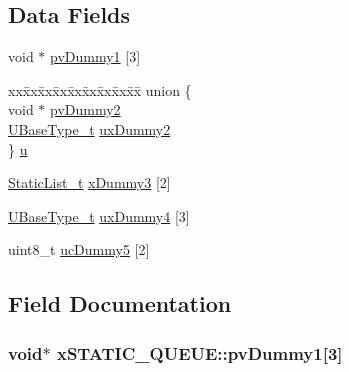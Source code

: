 \subsection*{Data Fields}
\begin{DoxyCompactItemize}
\item 
void $\ast$ \hyperlink{structxSTATIC__QUEUE_aacf22a66a8d723648995692ec77ee416}{pv\+Dummy1} \mbox{[}3\mbox{]}
\item 
\begin{tabbing}
xx\=xx\=xx\=xx\=xx\=xx\=xx\=xx\=xx\=\kill
union \{\\
\>void $\ast$ \hyperlink{structxSTATIC__QUEUE_adb72a02b22a558f6fad381d65af5ac68}{pvDummy2}\\
\>\hyperlink{portmacro_8h_a646f89d4298e4f5afd522202b11cb2e6}{UBaseType\_t} \hyperlink{structxSTATIC__QUEUE_ab4e6a2a0bb59ba54d05927e99afd553f}{uxDummy2}\\
\} \hyperlink{structxSTATIC__QUEUE_a9fce4315c70458318897f892724d24d3}{u}\\

\end{tabbing}\item 
\hyperlink{FreeRTOS_8h_a9735ad9101a2bd25f83a62089a4acee6}{Static\+List\+\_\+t} \hyperlink{structxSTATIC__QUEUE_add0de93e08b632124122850bcd543597}{x\+Dummy3} \mbox{[}2\mbox{]}
\item 
\hyperlink{portmacro_8h_a646f89d4298e4f5afd522202b11cb2e6}{U\+Base\+Type\+\_\+t} \hyperlink{structxSTATIC__QUEUE_a502854697731754ce445f6503d14b127}{ux\+Dummy4} \mbox{[}3\mbox{]}
\item 
uint8\+\_\+t \hyperlink{structxSTATIC__QUEUE_a541c5044376603540cc3c9cabcbdc5e6}{uc\+Dummy5} \mbox{[}2\mbox{]}
\end{DoxyCompactItemize}


\subsection{Field Documentation}
\subsubsection[{\texorpdfstring{pv\+Dummy1}{pvDummy1}}]{\setlength{\rightskip}{0pt plus 5cm}void$\ast$ x\+S\+T\+A\+T\+I\+C\+\_\+\+Q\+U\+E\+U\+E\+::pv\+Dummy1\mbox{[}3\mbox{]}}\hypertarget{structxSTATIC__QUEUE_aacf22a66a8d723648995692ec77ee416}{}\label{structxSTATIC__QUEUE_aacf22a66a8d723648995692ec77ee416}
